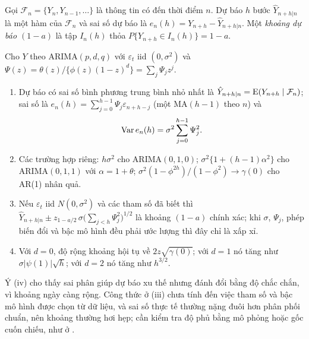 Gọi $\mathcal F_n=\{Y_n,Y_{n-1},\dots\}$ là thông tin có đến thời điểm $n$. Dự báo $h$ bước $\hat Y_{n+h|n}$ là một hàm của $\mathcal F_n$ và sai số dự báo là $e_n(h)=Y_{n+h}-\hat Y_{n+h|n}$. Một \emph{khoảng dự báo $(1-a)$} là tập $I_n(h)$ thỏa $P\{Y_{n+h}\in I_n(h)\}=1-a$.
\begin{kq}
Cho $Y$ theo ARIMA$(p,d,q)$ với $\varepsilon_t$ iid $(0,\sigma^2)$ và $\Psi(z)=\theta(z)/\{\phi(z)(1-z)^d\}=\sum_j\Psi_jz^j$.
\begin{enumerate}[label=(\roman*),leftmargin=*,itemsep=1pt]
\item Dự báo có sai số bình phương trung bình nhỏ nhất là $\hat Y_{n+h|n}=\mathrm{E}(Y_{n+h}\mid\mathcal F_n)$; sai số là $e_n(h)=\sum_{j=0}^{h-1}\Psi_j\varepsilon_{n+h-j}$ (một MA$(h-1)$ theo $n$) và
\[
\operatorname{Var} e_n(h)=\sigma^2\sum_{j=0}^{h-1}\Psi_j^2.
\]
\item Các trường hợp riêng: $h\sigma^2$ cho ARIMA$(0,1,0)$; $\sigma^2\{1+(h-1)\alpha^2\}$ cho ARIMA$(0,1,1)$ với $\alpha=1+\theta$; $\sigma^2(1-\phi^{2h})/(1-\phi^2)\to\gamma(0)$ cho AR(1) nhân quả.
\item Nếu $\varepsilon_t$ iid $N(0,\sigma^2)$ và các tham số đã biết thì $\hat Y_{n+h|n}\pm z_{1-a/2}\,\sigma\bigl(\sum_{j<h}\Psi_j^2\bigr)^{1/2}$ là khoảng $(1-a)$ chính xác; khi $\sigma$, $\Psi_j$, phép biến đổi và bậc mô hình đều phải ước lượng thì đây chỉ là xấp xỉ.
\item Với $d=0$, độ rộng khoảng hội tụ về $2z\sqrt{\gamma(0)}$; với $d=1$ nó tăng như $\sigma|\psi(1)|\sqrt h$; với $d=2$ nó tăng như $h^{3/2}$.
\end{enumerate}
\end{kq}
Ý (iv) cho thấy sai phân giúp dự báo xu thế nhưng đánh đổi bằng độ chắc chắn, vì khoảng ngày càng rộng. Công thức ở (iii) chưa tính đến việc tham số và bậc mô hình được chọn từ dữ liệu, và sai số thực tế thường nặng đuôi hơn phân phối chuẩn, nên khoảng thường hơi hẹp; cần kiểm tra độ phủ bằng mô phỏng hoặc gốc cuốn chiếu, như ở .

